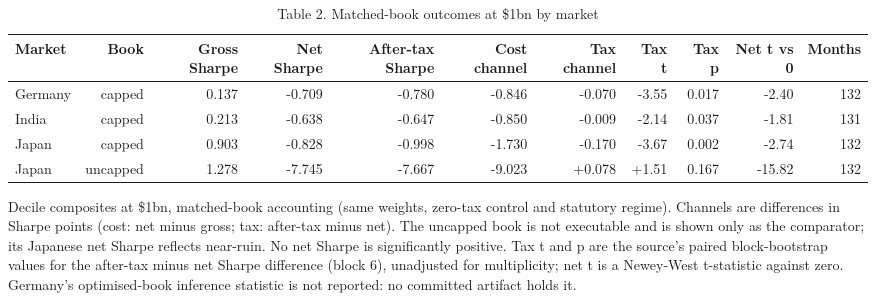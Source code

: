 \begin{table}[t]
\centering
\small
\caption{Table 2. Matched-book outcomes at \$1bn by market}
\label{tab:outcomes}
\begin{tabular}{lrrrrrrrrrr}
\toprule
Market & Book & Gross Sharpe & Net Sharpe & After-tax Sharpe & Cost channel & Tax channel & Tax t & Tax p & Net t vs 0 & Months \\
\midrule
Germany & capped & 0.137 & -0.709 & -0.780 & -0.846 & -0.070 & -3.55 & 0.017 & -2.40 & 132 \\
India & capped & 0.213 & -0.638 & -0.647 & -0.850 & -0.009 & -2.14 & 0.037 & -1.81 & 131 \\
Japan & capped & 0.903 & -0.828 & -0.998 & -1.730 & -0.170 & -3.67 & 0.002 & -2.74 & 132 \\
Japan & uncapped & 1.278 & -7.745 & -7.667 & -9.023 & +0.078 & +1.51 & 0.167 & -15.82 & 132 \\
\bottomrule
\end{tabular}
\par\vspace{2pt}
\parbox{\textwidth}{\footnotesize Decile composites at \$1bn, matched-book accounting (same weights, zero-tax control and statutory regime). Channels are differences in Sharpe points (cost: net minus gross; tax: after-tax minus net). The uncapped book is not executable and is shown only as the comparator; its Japanese net Sharpe reflects near-ruin. No net Sharpe is significantly positive. Tax t and p are the source's paired block-bootstrap values for the after-tax minus net Sharpe difference (block 6), unadjusted for multiplicity; net t is a Newey-West t-statistic against zero. Germany's optimised-book inference statistic is not reported: no committed artifact holds it.}
\end{table}
